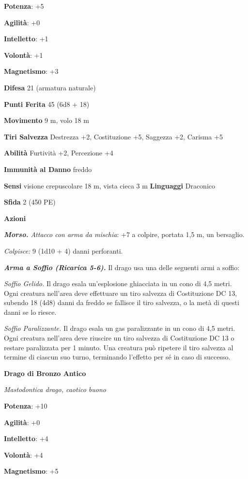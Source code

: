 \begin{multicols}{2}
\textbf{Potenza}: +5

\textbf{Agilità}: +0

\textbf{Intelletto}: +1

\textbf{Volontà}: +1

\textbf{Magnetismo}: +3

\textbf{Difesa} 21 (armatura naturale)

\textbf{Punti Ferita} 45 (6d8 + 18)

\textbf{Movimento} 9 m, volo 18 m

\textbf{Tiri Salvezza} Destrezza +2, Costituzione +5, Saggezza +2,
Carisma +5

\textbf{Abilità} Furtività +2, Percezione +4

\textbf{Immunità al Danno} freddo

\textbf{Sensi} visione crepuscolare 18 m, vista cieca 3 m
\textbf{Linguaggi} Draconico

\textbf{Sfida} 2 (450 PE)

\textbf{Azioni}

\emph{\textbf{Morso.} Attacco con arma da mischia}: +7 a colpire,
portata 1,5 m, un bersaglio.

\emph{Colpisce:} 9 (1d10 + 4) danni perforanti.

\emph{\textbf{Arma a Soffio (Ricarica 5-6).}} Il drago usa una delle
seguenti armi a soffio:

\emph{Soffio Gelido.} Il drago esala un'esplosione ghiacciata in un cono
di 4,5 metri. Ogni creatura nell'area deve effettuare un tiro salvezza
di Costituzione DC 13, subendo 18 (4d8) danni da freddo se fallisce il
tiro salvezza, o la metà di questi danni se lo riesce.

\emph{Soffio Paralizzante.} Il drago esala un gas paralizzante in un
cono di 4,5 metri. Ogni creatura nell'area deve riuscire un tiro
salvezza di Costituzione DC 13 o restare paralizzata per 1 minuto. Una
creatura può ripetere il tiro salvezza al termine di ciascun suo turno,
terminando l'effetto per sé in caso di successo.



\textbf{Drago di Bronzo Antico}

\emph{Mastodontica drago, caotico buono}

\textbf{Potenza}: +10

\textbf{Agilità}: +0

\textbf{Intelletto}: +4

\textbf{Volontà}: +4

\textbf{Magnetismo}: +5


\end{multicols}
